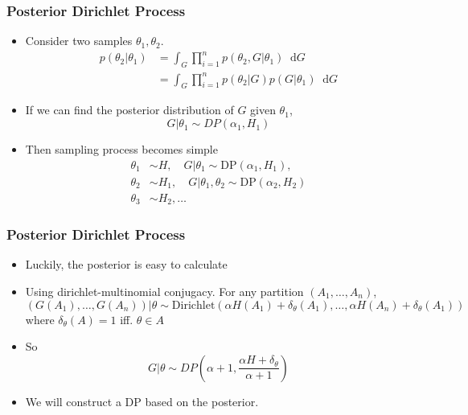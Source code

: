 \documentclass{beamer}
\newcommand*\diff{\mathop{}\!\mathrm{d}}
\begin{document}
\begin{frame}
	\frametitle{Posterior Dirichlet Process}
	\begin{itemize}
		\item Consider two samples $\theta_1, \theta_2$.
		\begin{align*}
			p(\theta_2 | \theta_1) & = \int_G \prod_{i=1}^{n} p(\theta_2, G| \theta_1) \diff G \\
								& = \int_G \prod_{i=1}^{n} p(\theta_2|G) p(G|\theta_1) \diff G 
		\end{align*}
		\item If we can find the posterior distribution of $G$ given $\theta_1$,
			\[
			G|\theta_1 \sim DP(\alpha_1, H_1)
			\]
		\item Then sampling process becomes simple
		\begin{align*}
		\theta_1 & \sim H, \quad G|\theta_1 \sim \text{DP}(\alpha_1, H_1), \\
		\theta_2 & \sim H_1, \quad G|\theta_1, \theta_2 \sim \text{DP}(\alpha_2, H_2) \\
		\theta_3 & \sim H_2, \ldots		
		\end{align*}
	\end{itemize}
\end{frame}

\begin{frame}
	\frametitle{Posterior Dirichlet Process}
	\begin{itemize}
		\item Luckily, the posterior is easy to calculate
		\item Using dirichlet-multinomial conjugacy. For any partition $(A_1, \ldots, A_n)$,
		\[
		(G(A_1), \ldots, G(A_n))|\theta \sim \text{Dirichlet}(\alpha H(A_1)+\delta_{\theta}(A_1), \ldots, \alpha H(A_n)+\delta_{\theta}(A_1))
		\]
		where $\delta_{\theta}(A)=1$ iff. $\theta \in A$
		\item So 
			\[
			G|\theta \sim DP(\alpha+1, \frac{\alpha H + \delta_{\theta}}{\alpha+1})
			\]
		\item We will construct a DP based on the posterior.
	\end{itemize}
\end{frame}
\end{document}
